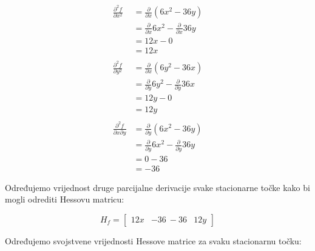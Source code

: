 \documentclass[12pt,a4paper]{report}
\begin{document}
\begin{align*}
    \frac{\partial^2 f}{\partial x^2} & = \frac{\partial}{\partial x} (6x^2 - 36y)\\
    & = \frac{\partial}{\partial x} 6x^2 - \frac{\partial}{\partial x} 36y\\
    & = 12x - 0\\
    & = 12x\\
    \\
    \frac{\partial^2 f}{\partial y^2} & = \frac{\partial}{\partial x} (6y^2 - 36x)\\
    & = \frac{\partial}{\partial y} 6y^2 - \frac{\partial}{\partial y} 36x\\
    & = 12y - 0\\
    & = 12y\\
    \\
    \frac{\partial^2 f}{\partial x \partial y} & = \frac{\partial}{\partial y} (6x^2 - 36y) \\
    & = \frac{\partial}{\partial y} 6x^2 - \frac{\partial}{\partial y} 36y \\
    & = 0 - 36 \\
    & = -36
\end{align*}

Određujemo vrijednost druge parcijalne derivacije svake stacionarne točke kako bi mogli odrediti Hessovu matricu:

$$H_f = \begin{bmatrix} 12x & -36 \ -36 & 12y \end{bmatrix}$$

Određujemo svojstvene vrijednosti Hessove matrice za svaku stacionarnu točku:


\end{document}
